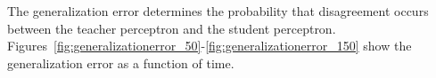 The generalization error determines the probability that disagreement occurs between the teacher perceptron and the student perceptron. Figures~\ref{fig:generalizationerror_50}-\ref{fig:generalizationerror_150} show the generalization error as a function of time.
